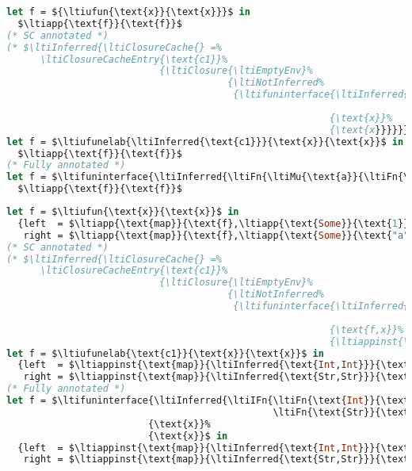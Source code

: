 {
\singlespacing
\begin{lstlisting}[language=ml,mathescape=true]
let f = ${\ltiufun{\text{x}}{\text{x}}}$ in
  $\ltiapp{\text{f}}{\text{f}}$
(* SC annotated *)
(* $\ltiInferred{\ltiClosureCache{} =%
      \ltiClosureCacheEntry{\text{c1}}%
                           {\ltiClosure{\ltiEmptyEnv}%
                                       {\ltiNotInferred%
                                        {\ltifuninterface{\ltiInferred{\ltiFn{\ltiClosureWithStkIDParens{\ltiEmptyEnv}{\text{c1}}{\ltiufun{\text{x}}{\text{x}}}}%
                                                                             {\ltiClosureWithStkIDParens{\ltiEmptyEnv}{\text{c1}}{\ltiufun{\text{x}}{\text{x}}}}}}%
                                                         {\text{x}}%
                                                         {\text{x}}}}}}$ *)
let f = $\ltiufunelab{\ltiInferred{\text{c1}}}{\text{x}}{\text{x}}$ in
  $\ltiapp{\text{f}}{\text{f}}$
(* Fully annotated *)
let f = $\ltifuninterface{\ltiInferred{\ltiFn{\ltiMu{\text{a}}{\ltiFn{\text{a}}{\text{a}}}}{\ltiMu{\text{a}}{\ltiFn{\text{a}}{\text{a}}}}}}{\text{x}}{\text{x}}$ in
  $\ltiapp{\text{f}}{\text{f}}$
\end{lstlisting}
}

{
\singlespacing
\begin{lstlisting}[language=ml,mathescape=true]
let f = $\ltiufun{\text{x}}{\text{x}}$ in
  {left  = $\ltiapp{\text{map}}{\text{f},\ltiapp{\text{Some}}{\text{1}}}$,
   right = $\ltiapp{\text{map}}{\text{f},\ltiapp{\text{Some}}{\text{"a"}}}$}
(* SC annotated *)
(* $\ltiInferred{\ltiClosureCache{} =%
      \ltiClosureCacheEntry{\text{c1}}%
                           {\ltiClosure{\ltiEmptyEnv}%
                                       {\ltiNotInferred%
                                        {\ltifuninterface{\ltiInferred{\ltiIFn{\ltiFn{\text{Int}}{\text{Int}}%
                                                                               \ltiFn{\text{Str}}{\text{Str}}}}}%
                                                         {\text{f,x}}%
                                                         {\ltiappinst{\text{f}}{\ltiInferred{\text{Int}}}{\text{x}}}}}}}$ *)
let f = $\ltiufunelab{\text{c1}}{\text{x}}{\text{x}}$ in
  {left  = $\ltiappinst{\text{map}}{\ltiInferred{\text{Int,Int}}}{\text{f},\ltiappinst{\text{Some}}{\ltiInferred{\text{Int}}}{\text{1}}}$,
   right = $\ltiappinst{\text{map}}{\ltiInferred{\text{Str,Str}}}{\text{f},\ltiappinst{\text{Some}}{\ltiInferred{\text{Str}}}{\text{"a"}}}$}
(* Fully annotated *)
let f = $\ltifuninterface{\ltiInferred{\ltiIFn{\ltiFn{\text{Int}}{\text{Int}}%
                                               \ltiFn{\text{Str}}{\text{Str}}}}}%
                         {\text{x}}%
                         {\text{x}}$ in
  {left  = $\ltiappinst{\text{map}}{\ltiInferred{\text{Int,Int}}}{\text{f},\ltiappinst{\text{Some}}{\ltiInferred{\text{Int}}}{\text{1}}}$,
   right = $\ltiappinst{\text{map}}{\ltiInferred{\text{Str,Str}}}{\text{f},\ltiappinst{\text{Some}}{\ltiInferred{\text{Str}}}{\text{"a"}}}$}
\end{lstlisting}
}

